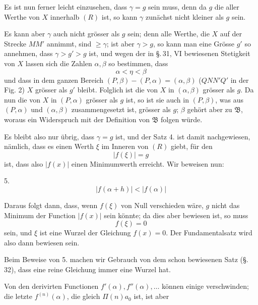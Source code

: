 
Es ist nun ferner leicht einzusehen, dass $\gamma=g$ sein muss, denn da $g$ die  aller Werthe von $X$ innerhalb $(R)$ ist, so kann $\gamma$ zunächst nicht kleiner als $g$ sein.

Es kann aber $\gamma$ auch nicht grösser als $g$ sein; denn alle Werthe, die $X$ auf der Strecke $MM'$ annimmt, sind $\ge\gamma$; ist aber $\gamma>g$, so kann man eine Grösse $g'$ so annehmen, dass $\gamma>g'>g$ ist, und wegen der in \S.\,31, VI bewiesenen Stetigkeit von $X$ lassen sich die Zahlen $\alpha,\beta$ so bestimmen, dass
\[
 \alpha<\eta<\beta
\]
und dass in dem ganzen Bereich $(P,\beta)-(P,\alpha)=(\alpha,\beta)$ ($QNN'Q'$ in der Fig. 2) $X$ grösser als $g'$ bleibt. Folglich ist die  von $X$ in $(\alpha,\beta)$ grösser als $g$. Da nun die  von $X$ in $(P,\alpha)$ grösser als $g$ ist, so ist sie auch in $(P,\beta)$, was aus $(P,\alpha)$ und $(\alpha,\beta)$ zusammengesetzt ist, grösser als $g$; $\beta$ gehört aber zu $\mathfrak B$, woraus ein Widerspruch mit der Definition von $\mathfrak B$ folgen würde.

Es bleibt also nur übrig, dass $\gamma=g$ ist, und der Satz 4. ist damit nachgewiesen, nämlich, dass es einen Werth $\xi$ im Inneren von $(R)$ giebt, für den
\[
 |f(\xi)|=g
\]
ist, dass also $|f(x)|$ einen Minimumwerth erreicht. Wir beweisen nun:

5. 
\begin{equation}
 |f(\alpha+h)|<|f(\alpha)|
\tag{10}
\end{equation}

Daraus folgt dann, dass, wenn $f(\xi)$ von Null verschieden wäre, $g$ nicht das Minimum der Function $|f(x)|$ sein könnte; da dies aber bewiesen ist, so muss
\begin{equation}
 f(\xi)=0
\tag{11}
\end{equation}
sein, und $\xi$ ist eine Wurzel der Gleichung $f(x)=0$. Der Fundamentalsatz wird also dann bewiesen sein.

Beim Beweise von 5. machen wir Gebrauch von dem schon bewiesenen Satz (\S.\,32), dass eine reine Gleichung immer eine Wurzel hat.

Von den derivirten Functionen $f'(\alpha),f''(\alpha),\ldots$ können einige verschwinden; die letzte $f^{(n)}(\alpha)$, die gleich $\Pi(n)a_0$ ist, ist aber
